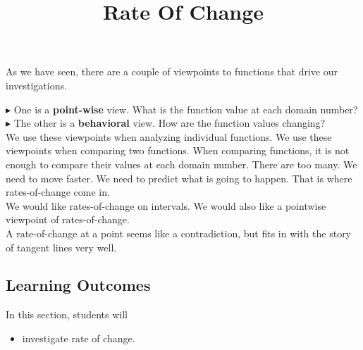 \documentclass{ximera}
\title{Rate Of Change}
\begin{document}
\begin{abstract}
\end{abstract}
\maketitle







As we have seen, there are a couple of viewpoints to functions that drive our investigations.

$\blacktriangleright$ One is a \textbf{\textcolor{purple!85!blue}{point-wise}} view.  What is the function value at each domain number? \\


$\blacktriangleright$ The other is a \textbf{\textcolor{purple!85!blue}{behavioral}} view.  How are the function values changing? \\



We use these viewpoints when analyzing individual functions.  We use these viewpoints when comparing two functions. When comparing functions, it is not enough to compare their values at each domain number.  There are too many.  We need to move faster.  We need to predict what is going to happen. That is where rates-of-change come in. \\




We would like rates-of-change on intervals.  We would also like a pointwise viewpoint of rates-of-change. \\



A rate-of-change at a point seems like a contradiction, but fits in with the story of tangent lines very well.













\subsection{Learning Outcomes}


\begin{sectionOutcomes}
In this section, students will 

\begin{itemize}
\item investigate rate of change.

\end{itemize}
\end{sectionOutcomes}
\end{document}
